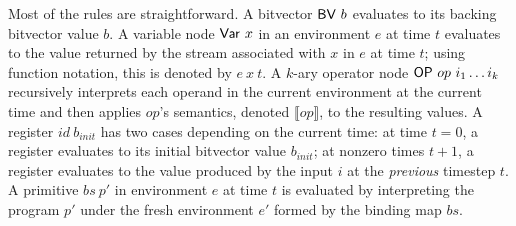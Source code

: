 Most of the rules are straightforward.
A bitvector $\mathsf{BV}\ b$
  evaluates to
  its backing bitvector value $b$.
A variable node $\mathsf{Var}\ x$ 
  in an environment $e$
  at time $t$
  evaluates to
  the value returned 
  by the stream associated
  with $x$ in $e$
  at time $t$; 
using function notation, this is
  denoted by $e\ x\ t$.
A $k$-ary operator node
  $\mathsf{OP}{}\ op\ i_1\ldots i_k$ recursively
  interprets each operand in the current
  environment at the current time 
  and then applies $op$'s semantics,
  denoted $\llbracket op \rrbracket$,
  to the resulting values.
A register \IRReg $id\ b_{init}$ has two cases 
  depending on the current time: 
at time $t = 0$, a register evaluates
  to its initial bitvector value $b_{init}$; 
at nonzero times $t + 1$, a register evaluates
  to the value produced by the input $i$
  at the \textit{previous} timestep $t$.
A primitive \IRPrim{} $bs\ p'$
  in environment $e$ at time $t$
  is evaluated by interpreting
  the program $p'$ under
  the fresh environment $e'$
  formed by the binding map $bs$.
  





